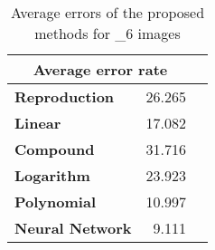 \begin{table}[H]
  \begin{center}
  \resizebox{5cm}{!} {
    \begin{tabular}{l r r}
    \multicolumn{2}{c}{\textbf{Average error rate}} \\ \hline 
        \textbf{Reproduction} & 26.265\\ 
        \textbf{Linear} & 17.082\\ 
        \textbf{Compound} & 31.716\\ 
        \textbf{Logarithm} & 23.923\\ 
        \textbf{Polynomial} & 10.997\\ 
        \textbf{Neural Network} & 9.111\\ 
    \end{tabular}
  }
  \caption{Average errors of the proposed methods for _6 images }
  \end{center}
\end{table}
